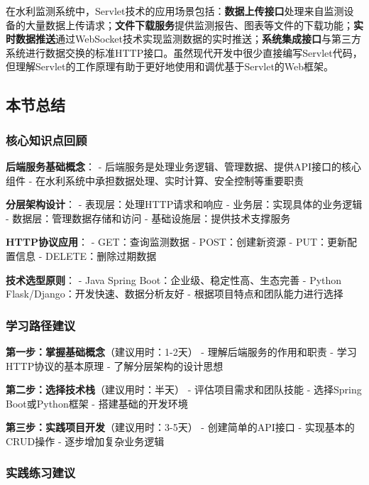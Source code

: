 在水利监测系统中，Servlet技术的应用场景包括：\textbf{数据上传接口}处理来自监测设备的大量数据上传请求；\textbf{文件下载服务}提供监测报告、图表等文件的下载功能；\textbf{实时数据推送}通过WebSocket技术实现监测数据的实时推送；\textbf{系统集成接口}与第三方系统进行数据交换的标准HTTP接口。虽然现代开发中很少直接编写Servlet代码，但理解Servlet的工作原理有助于更好地使用和调优基于Servlet的Web框架。

\subsection{本节总结}\label{ux672cux8282ux603bux7ed3}

\subsubsection{核心知识点回顾}\label{ux6838ux5fc3ux77e5ux8bc6ux70b9ux56deux987e}

\textbf{后端服务基础概念}： - 后端服务是处理业务逻辑、管理数据、提供API接口的核心组件 - 在水利系统中承担数据处理、实时计算、安全控制等重要职责

\textbf{分层架构设计}： - 表现层：处理HTTP请求和响应 - 业务层：实现具体的业务逻辑 - 数据层：管理数据存储和访问 - 基础设施层：提供技术支撑服务

\textbf{HTTP协议应用}： - GET：查询监测数据 - POST：创建新资源 - PUT：更新配置信息 - DELETE：删除过期数据

\textbf{技术选型原则}： - Java Spring Boot：企业级、稳定性高、生态完善 - Python Flask/Django：开发快速、数据分析友好 - 根据项目特点和团队能力进行选择

\subsubsection{学习路径建议}\label{ux5b66ux4e60ux8defux5f84ux5efaux8bae-1}

\textbf{第一步：掌握基础概念}（建议用时：1-2天） - 理解后端服务的作用和职责 - 学习HTTP协议的基本原理 - 了解分层架构的设计思想

\textbf{第二步：选择技术栈}（建议用时：半天） - 评估项目需求和团队技能 - 选择Spring Boot或Python框架 - 搭建基础的开发环境

\textbf{第三步：实践项目开发}（建议用时：3-5天） - 创建简单的API接口 - 实现基本的CRUD操作 - 逐步增加复杂业务逻辑

\subsubsection{实践练习建议}\label{ux5b9eux8df5ux7ec3ux4e60ux5efaux8bae}

